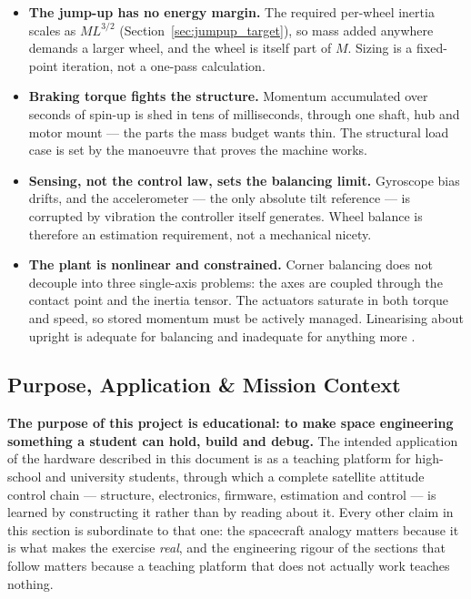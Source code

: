 \begin{itemize}
    \item \textbf{The jump-up has no energy margin.} The required per-wheel inertia scales as $M L^{3/2}$ (Section~\ref{sec:jumpup_target}), so mass added anywhere demands a larger wheel, and the wheel is itself part of $M$. Sizing is a fixed-point iteration, not a one-pass calculation.
    \item \textbf{Braking torque fights the structure.} Momentum accumulated over seconds of spin-up is shed in tens of milliseconds, through one shaft, hub and motor mount --- the parts the mass budget wants thin. The structural load case is set by the manoeuvre that proves the machine works.
    \item \textbf{Sensing, not the control law, sets the balancing limit.} Gyroscope bias drifts, and the accelerometer --- the only absolute tilt reference --- is corrupted by vibration the controller itself generates. Wheel balance is therefore an estimation requirement, not a mechanical nicety.
    \item \textbf{The plant is nonlinear and constrained.} Corner balancing does not decouple into three single-axis problems: the axes are coupled through the contact point and the inertia tensor. The actuators saturate in both torque and speed, so stored momentum must be actively managed. Linearising about upright is adequate for balancing and inadequate for anything more \cite{muehlebach2017cubli}.
\end{itemize}

\subsection{Purpose, Application \& Mission Context}
\label{sec:application}

\textbf{The purpose of this project is educational: to make space engineering something a student can hold, build and debug.} The intended application of the hardware described in this document is as a teaching platform for high-school and university students, through which a complete satellite attitude control chain --- structure, electronics, firmware, estimation and control --- is learned by constructing it rather than by reading about it. Every other claim in this section is subordinate to that one: the spacecraft analogy matters because it is what makes the exercise \emph{real}, and the engineering rigour of the sections that follow matters because a teaching platform that does not actually work teaches nothing.

